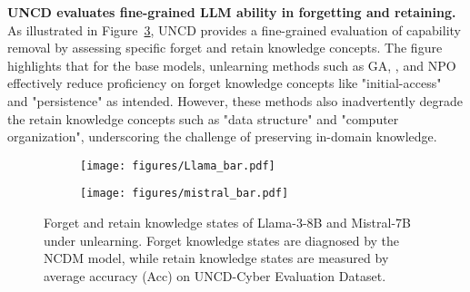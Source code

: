 \noindent \textbf{UNCD evaluates fine-grained LLM ability in forgetting and retaining.} As illustrated in Figure~\ref{fig:forget and retain}, UNCD provides a fine-grained evaluation of capability removal by assessing specific forget and retain knowledge concepts. The figure highlights that for the base models, unlearning methods such as GA, \GAGD, and NPO effectively reduce proficiency on forget knowledge concepts like "initial-access" and "persistence" as intended. However, these methods also inadvertently degrade the retain knowledge concepts such as "data structure" and "computer organization", underscoring the challenge of preserving in-domain knowledge.  

\begin{figure}[t!]
    \centering
    \begin{subfigure}{0.48\textwidth}
        \centering
        \texttt{[image: figures/Llama\_bar.pdf]}
        \label{fig:Llama_bar}
    \end{subfigure}
    \vspace{-5pt}
    \hfill
    \begin{subfigure}{0.48\textwidth}
        \centering
        \texttt{[image: figures/mistral\_bar.pdf]}
        \label{fig:mistral_bar}
    \end{subfigure}
    \vspace{-5pt}
    \caption{Forget and retain knowledge states of Llama-3-8B and Mistral-7B under unlearning. Forget knowledge states are diagnosed by the NCDM model, while retain knowledge states are measured by average accuracy (Acc) on UNCD-Cyber Evaluation Dataset.}
    \label{fig:forget and retain}
    \vspace{-10pt}
\end{figure}

    

